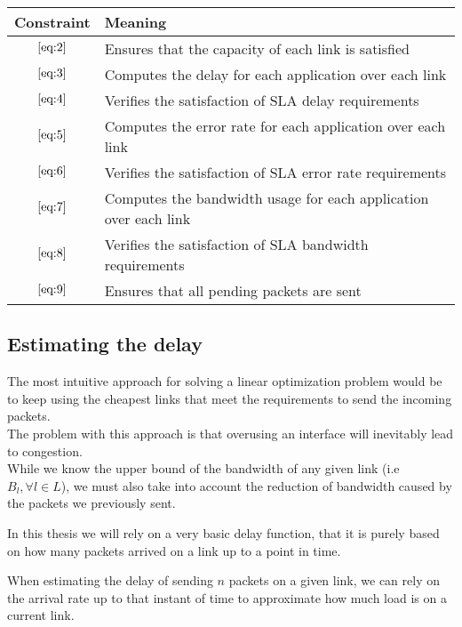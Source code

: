 	\begin{center}
	\begin{table}[htb]
		\centering
		\makegapedcells
		\begin{tabular}{|c|p{9cm}|}
			\hline
			Constraint  & Meaning \\ \hline
			$\eqref{eq:2}$ & Ensures that the capacity of each link is satisfied  \\ \hline
			$\eqref{eq:3}$ & Computes the delay for each application over each link \\ \hline
			$\eqref{eq:4}$ & Verifies the satisfaction of SLA delay requirements  \\ \hline
			$\eqref{eq:5}$ & Computes the error rate for each application over each link  \\ \hline
			$\eqref{eq:6}$ & Verifies the satisfaction of SLA error rate requirements  \\ \hline
			$\eqref{eq:7}$ & Computes the bandwidth usage for each application over each link  \\ \hline
			$\eqref{eq:8}$ & Verifies the satisfaction of SLA bandwidth requirements  \\ \hline
			$\eqref{eq:9}$ & Ensures that all pending packets are sent  \\ \hline
		\end{tabular}
	\end{table}
\end{center}




\subsection{Estimating the delay} \label{estimating_the_delay}

The most intuitive approach for solving a linear optimization problem would be to keep using the cheapest links that meet the requirements to send the incoming packets. \\
The problem with this approach is that overusing an interface will inevitably lead to congestion. \\ While we know the upper bound of the bandwidth of any given link (i.e $B_l, \forall l \in L$), we must also take into account the reduction of bandwidth caused by the packets we previously sent.

In this thesis we will rely on a very basic delay function, that it is purely based on how many packets arrived on a link up to a point in time.

When estimating the delay of sending $n$ packets on a given link, we can rely on the arrival rate up to that instant of time to approximate how much load is on a current link.


